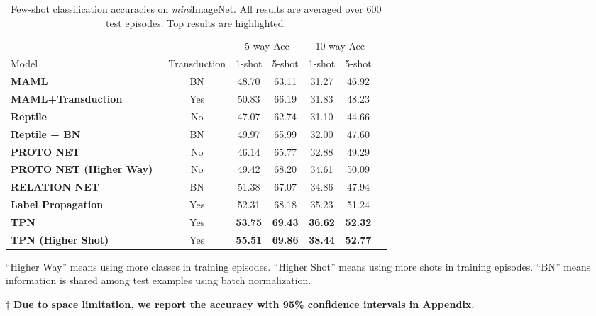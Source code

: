 \documentclass{article} \usepackage{iclr2019_conference,times}
\def\mini{{\textit{mini}ImageNet}}
\begin{document}
\begin{table}[t]
\centering
\begin{threeparttable}
\small
\caption{Few-shot classification accuracies on \mini. All results are averaged over 600 test episodes. Top results are highlighted.}
\label{mini-results}
\begin{tabular}{lcccccc} \hline
                                       					&              & \multicolumn{2}{c}{5-way Acc} & \multicolumn{2}{c}{10-way Acc}                           \\
Model                                  					& Transduction & \multicolumn{1}{c}{1-shot} & \multicolumn{1}{c}{5-shot} & \multicolumn{1}{c}{1-shot} & \multicolumn{1}{c}{5-shot}\\ \hline
\textbf{MAML~\citep{maml}}             					& BN & 48.70  & 63.11 & 31.27 & 46.92    \\
\textbf{MAML+Transduction}             					& Yes & 50.83  & 66.19 & 31.83 & 48.23    \\
\textbf{Reptile~\citep{first-order}}                    & No & 47.07  & 62.74 & 31.10 & 44.66    \\
\textbf{Reptile + BN~\citep{first-order}} 	            & BN & 49.97  & 65.99 & 32.00 & 47.60    \\
\textbf{PROTO NET~\citep{prototypical}}                 & No & 46.14  & 65.77 & 32.88 & 49.29    \\
\textbf{PROTO NET (Higher Way)~\citep{prototypical}}	& No & 49.42  & 68.20 & 34.61 & 50.09    \\
\textbf{RELATION NET~\citep{compare}}                  	& BN & 51.38  & 67.07 & 34.86 & 47.94    \\ \hline
\textbf{Label Propagation}                              & Yes & 52.31  & 68.18 & 35.23 & 51.24\\
\textbf{TPN}                                            & Yes & \textbf{53.75}    & \textbf{69.43} & \textbf{36.62} & \textbf{52.32}    \\
\textbf{TPN (Higher Shot)}                              & Yes & \textbf{55.51}    & \textbf{69.86} & \textbf{38.44} & \textbf{52.77}    \\ \hline
\end{tabular}
\begin{tablenotes}
  	\item * ``Higher Way'' means using more classes in training episodes. ``Higher Shot'' means using more shots in training episodes. ``BN'' means information is shared among test examples using batch normalization.
  	\item $\dagger$ \textbf{Due to space limitation, we report the accuracy with 95\% confidence intervals in Appendix.}
\end{tablenotes} 
\end{threeparttable}
\end{table}
\end{document}
